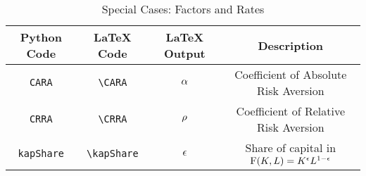 
\renewcommand{\kapShare}{\ensuremath{\epsilon}}

\begin{table}[h]
	\centering
	\begin{tabular}{||>{\ttfamily}cccc||}
		\hline
		 Python Code & LaTeX Code & LaTeX Output & Description
\\ \hline
   \texttt{CARA} & \verb|\CARA|    & $\alpha$    & Coefficient of Absolute Risk Aversion%
\\ \texttt{CRRA} & \verb|\CRRA|    & $\rho$    & Coefficient of Relative Risk Aversion%
\\ \texttt{kapShare} & \verb|\kapShare|    & $\kapShare$    & Share of capital in $\FFunc(\Kap,\Labor)=\Kap^{\kapShare}\Labor^{1-\kapShare}$
\\	\hline
	\end{tabular}
	\caption{Special Cases: Factors and Rates}
	\label{table:SpecialFactors}
\end{table}


